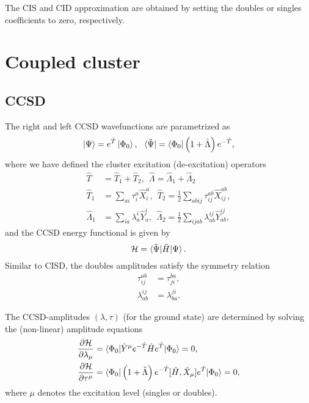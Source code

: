\documentclass{article}
\begin{document}
The CIS and CID approximation are obtained by setting the doubles or singles coefficients to zero, respectively.

\section{Coupled cluster}
\subsection{CCSD}
The right and left CCSD wavefunctions are parametrized as 
\begin{align}
    \ket{\Psi} = e^{\hat{T}}\ket{\Phi_0}, \ \ \bra{\tilde{\Psi}} = \bra{\Phi_0}\left(1+\hat{\Lambda} \right)e^{-\hat{T}},
\end{align}
where we have defined the cluster excitation (de-excitation) operators
\begin{align}
    \hat{T} &= \hat{T}_1 + \hat{T}_2, \ \
    \hat{\Lambda} = \hat{\Lambda}_1 + \hat{\Lambda}_2 \\
    \hat{T}_1 &= \sum_{ai} \tau^a_i \hat{X}^a_i, \ \  \hat{T}_2 = \frac{1}{2} \sum_{abij} \tau^{ab}_{ij} \hat{X}^{ab}_{ij}, \\
    \hat{\Lambda}_1 &= \sum_{ia} \lambda^i_a \hat{Y}^i_a, \ \ \hat{\Lambda}_2 = \frac{1}{2} \sum_{ijab} \lambda^{ij}_{ab} \hat{Y}^{ij}_{ab},
\end{align}
and the CCSD energy functional is given by
\begin{equation}
    \mathcal{H} = \braket{\tilde{\Psi}|\hat{H}|\Psi}.
\end{equation}
Similar to CISD, the doubles amplitudes satisfy the symmetry relation
\begin{align}
    \tau^{ab}_{ij} &= \tau^{ba}_{ji}, \\
    \lambda^{ij}_{ab} &= \lambda^{ji}_{ba}.
\end{align}

The CCSD-amplitudes $(\lambda, \tau)$ (for the ground state) are determined by solving the (non-linear) amplitude equations
\begin{align}
    \frac{\partial \mathcal{H}}{\partial \lambda_\mu} &= \braket{\Phi_0|\hat{Y}^\mu e^{-\hat{T}} \hat{H}e^{\hat{T}}|\Phi_0} = 0, \\
    \frac{\partial \mathcal{H}}{\partial \tau^\mu} &= \braket{\Phi_0|\left(1+\hat{\Lambda}\right)e^{-\hat{T}}[\hat{H}, \hat{X}_\mu]e^{\hat{T}}|\Phi_0} = 0,
\end{align}
where $\mu$ denotes the excitation level (singles or doubles).
\end{document}
